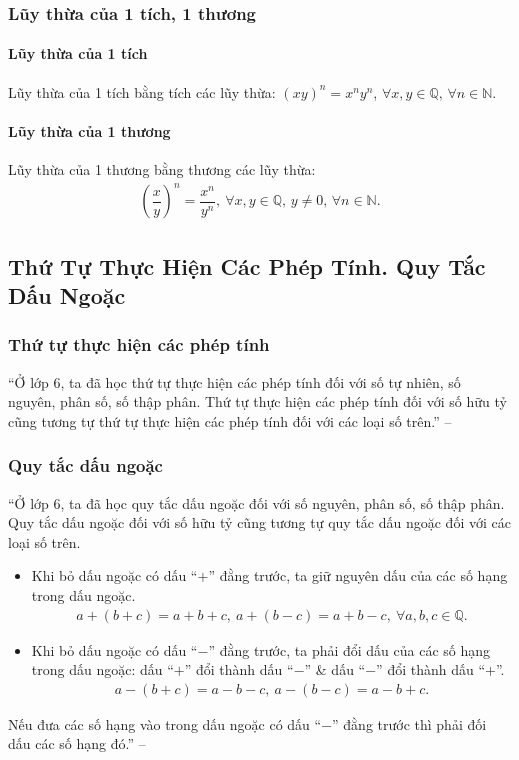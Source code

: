 \documentclass{article}
\numberwithin{equation}{section}
\begin{document}
\subsubsection{Lũy thừa của 1 tích, 1 thương}

\paragraph{Lũy thừa của 1 tích}
Lũy thừa của 1 tích bằng tích các lũy thừa: $(xy)^n = x^ny^n$, $\forall x,y\in\mathbb{Q},\,\forall n\in\mathbb{N}$.

\paragraph{Lũy thừa của 1 thương}
Lũy thừa của 1 thương bằng thương các lũy thừa:
\begin{align*}
	\left(\dfrac{x}{y}\right)^n = \dfrac{x^n}{y^n},\ \forall x,y\in\mathbb{Q},\,y\ne 0,\,\forall n\in\mathbb{N}.
\end{align*}

\subsection{Thứ Tự Thực Hiện Các Phép Tính. Quy Tắc Dấu Ngoặc}

\subsubsection{Thứ tự thực hiện các phép tính}
``Ở lớp 6, ta đã học thứ tự thực hiện các phép tính đối với số tự nhiên, số nguyên, phân số, số thập phân. Thứ tự thực hiện các phép tính đối với số hữu tỷ cũng tương tự thứ tự thực hiện các phép tính đối với các loại số trên.'' -- \cite[p. 23]{SGK_Toan_7_Canh_Dieu_tap_1}

\subsubsection{Quy tắc dấu ngoặc}
``Ở lớp 6, ta đã học quy tắc dấu ngoặc đối với số nguyên, phân số, số thập phân. Quy tắc dấu ngoặc đối với số hữu tỷ cũng tương tự quy tắc dấu ngoặc đối với các loại số trên.
\begin{itemize}
	\item Khi bỏ dấu ngoặc có dấu ``$+$'' đằng trước, ta giữ nguyên dấu của các số hạng trong dấu ngoặc.
	\begin{align*}
		a + (b + c) = a + b + c,\ a + (b - c) = a + b - c,\ \forall a,b,c\in\mathbb{Q}.
	\end{align*}
	\item Khi bỏ dấu ngoặc có dấu ``$-$'' đằng trước, ta phải đổi dấu của các số hạng trong dấu ngoặc: dấu ``$+$'' đổi thành dấu ``$-$'' \& dấu ``$-$'' đổi thành dấu ``$+$''.
	\begin{align*}
		a - (b + c) = a - b - c,\ a - (b - c) = a - b + c.
	\end{align*}
\end{itemize}
Nếu đưa các số hạng vào trong dấu ngoặc có dấu ``$-$'' đằng trước thì phải đối dấu các số hạng đó.'' -- \cite[p. 24]{SGK_Toan_7_Canh_Dieu_tap_1}
\end{document}
